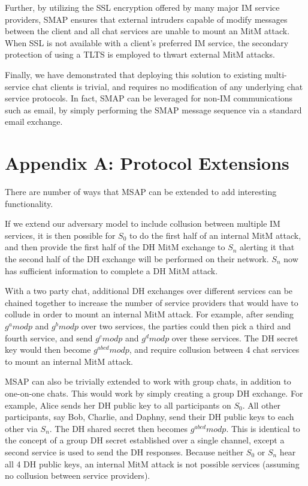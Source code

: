 \documentclass[twoside,10pt]{article}
\begin{document}
\begin{multicols}{2}
Further, by utilizing the SSL encryption offered by many major IM service providers, SMAP ensures that external intruders capable of modify messages between the client and all chat services are unable to mount an MitM attack.  When SSL is not available with a client's preferred IM service, the secondary protection of using a TLTS is employed to thwart external MitM attacks.

Finally, we have demonstrated that deploying this solution to existing multi-service chat clients is trivial, and requires no modification of any underlying chat service protocols.  In fact, SMAP can be leveraged for non-IM communications such as email, by simply performing the SMAP message sequence via a standard email exchange.

\section{Appendix A: Protocol Extensions}
There are number of ways that MSAP can be extended to add interesting functionality.  

If we extend our adversary model to include collusion between multiple IM services, it is then possible for $S_0$ to do the first half of an internal MitM attack, and then provide the first half of the DH MitM exchange to $S_n$ alerting it that the second half of the DH exchange will be performed on their network.  $S_n$ now has sufficient information to complete a DH MitM attack.

With a two party chat, additional DH exchanges over different services can be chained together to increase the number of service providers that would have to collude in order to mount an internal MitM attack.  For example, after sending $g^a mod p$ and $g^b mod p$ over two services, the parties could then pick a third and fourth service, and send $g^c mod p$ and $g^d mod p$ over these services.  The DH secret key would then become $g^{abcd} mod p$, and require collusion between 4 chat services to mount an internal MitM attack.


MSAP can also be trivially extended to work with group chats, in addition to one-on-one chats.  This would work by simply creating a group DH exchange.  For example, Alice sends her DH public key to all participants on $S_0$.  All other participants, say Bob, Charlie, and Daphny, send their DH public keys to each other via $S_n$.  The DH shared secret then becomes $g^{abcd} mod p$.  This is identical to the concept of a group DH secret established over a single channel, except a second service is used to send the DH responses.  Because neither $S_0$ or $S_n$ hear all 4 DH public keys, an internal MitM attack is not possible services (assuming no collusion between service providers).


\end{multicols}
\end{document}
